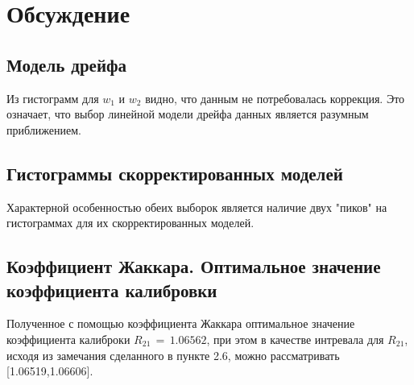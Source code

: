 \section{Обсуждение}
\subsection{Модель дрейфа}
\begin{flushleft}
	Из гистограмм для $w_1$ и $w_2$ видно, что данным не потребовалась коррекция. Это означает, что выбор линейной модели дрейфа данных является разумным приближением.
\end{flushleft}

\subsection{Гистограммы скорректированных моделей}
\begin{flushleft}
	Характерной особенностью обеих выборок является наличие двух "пиков" на гистограммах для их скорректированных моделей.
\end{flushleft}

\subsection{Коэффициент Жаккара. Оптимальное значение коэффициента калибровки}
\begin{flushleft}
	Полученное с помощью коэффициента Жаккара оптимальное значение коэффициента калиброки $R_{21} \,=\, 1.06562$, при этом в качестве интревала для $R_{21}$, исходя из замечания сделанного в пункте 2.6, можно рассматривать [1.06519,1.06606].
\end{flushleft}